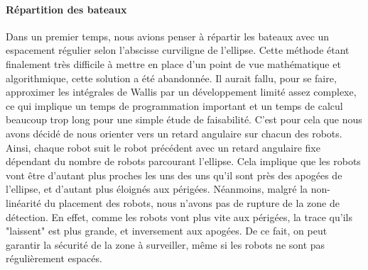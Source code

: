 
\paragraph{Répartition des bateaux}
Dans un premier temps, nous avions penser à répartir les bateaux avec un espacement régulier selon l'abscisse curviligne de l'ellipse.
Cette méthode étant finalement très difficile à mettre en place d'un point de vue mathématique et algorithmique, cette solution a été abandonnée. Il aurait fallu, pour se faire, approximer les intégrales de Wallis par un développement limité assez complexe, ce qui implique un temps de programmation important et un temps de calcul beaucoup trop long pour une simple étude de faisabilité.
C'est pour cela que nous avons décidé de nous orienter vers un retard angulaire sur chacun des robots. Ainsi, chaque robot suit le robot précédent avec un retard angulaire fixe dépendant du nombre de robots parcourant l'ellipse. Cela implique que les robots vont être d'autant plus proches les uns des uns qu'il sont près des apogées de l'ellipse, et d'autant plus éloignés aux périgées.
Néanmoins, malgré la non-linéarité du placement des robots, nous n'avons pas de rupture de la zone de détection. En effet, comme les robots vont plus vite aux périgées, la trace qu'ils "laissent" est plus grande, et inversement aux apogées. De ce fait, on peut garantir la sécurité de la zone à surveiller, même si les robots ne sont pas régulièrement espacés.


